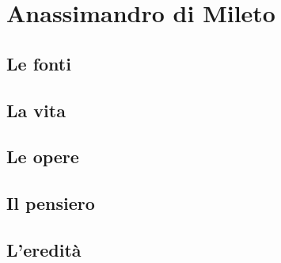 \chapter{Anassimandro di Mileto}

\section{Le fonti}

\section{La vita}

\section{Le opere}

\section{Il pensiero}

\section{L'eredità}
